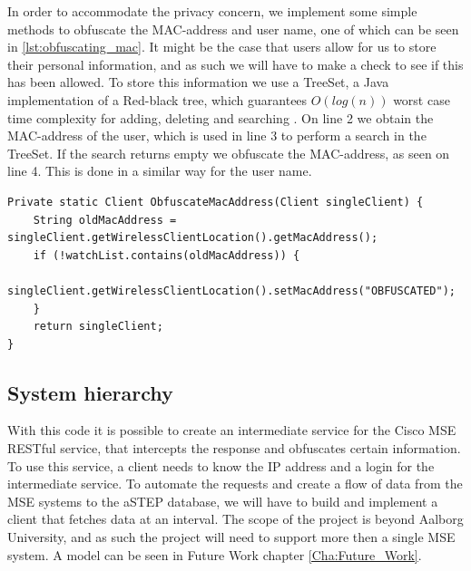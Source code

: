 In order to accommodate the privacy concern, we implement some simple methods to obfuscate the MAC-address and user name, one of which can be seen in \cref{lst:obfuscating_mac}. It might be the case that users allow for us to store their personal information, and as such we will have to make a check to see if this has been allowed. To store this information we use a TreeSet, a Java implementation of a Red-black tree, which guarantees $O(log(n))$ worst case time complexity for adding, deleting and searching \cite{aa_book}\cite{treeset}. On line 2 we obtain the MAC-address of the user, which is used in line 3 to perform a search in the TreeSet. If the search returns empty we obfuscate the MAC-address, as seen on line 4. This is done in a similar way for the user name.

\begin{lstlisting}[caption={Obfuscating mac-address},label={lst:obfuscating_mac},language=inc_Java]
Private static Client ObfuscateMacAddress(Client singleClient) {
    String oldMacAddress = singleClient.getWirelessClientLocation().getMacAddress();
    if (!watchList.contains(oldMacAddress)) {
        singleClient.getWirelessClientLocation().setMacAddress("OBFUSCATED");
    }
    return singleClient;
}
\end{lstlisting}

\subsection{System hierarchy}\label{subsec:system_hierarchy}
With this code it is possible to create an intermediate service for the Cisco MSE RESTful service, that intercepts the response and obfuscates certain information. To use this service, a client needs to know the IP address and a login for the intermediate service. To automate the requests and create a flow of data from the MSE systems to the aSTEP database, we will have to build and implement a client that fetches data at an interval. The scope of the project is beyond Aalborg University, and as such the project will need to support more then a single MSE system. A model can be seen in Future Work chapter \ref{Cha:Future_Work}. 